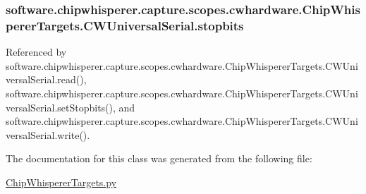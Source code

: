 \subsubsection[{stopbits}]{\setlength{\rightskip}{0pt plus 5cm}software.\+chipwhisperer.\+capture.\+scopes.\+cwhardware.\+Chip\+Whisperer\+Targets.\+C\+W\+Universal\+Serial.\+stopbits}\label{classsoftware_1_1chipwhisperer_1_1capture_1_1scopes_1_1cwhardware_1_1ChipWhispererTargets_1_1CWUniversalSerial_afe319dd6e0c353089c9d91278570ffa9}


Referenced by software.\+chipwhisperer.\+capture.\+scopes.\+cwhardware.\+Chip\+Whisperer\+Targets.\+C\+W\+Universal\+Serial.\+read(), software.\+chipwhisperer.\+capture.\+scopes.\+cwhardware.\+Chip\+Whisperer\+Targets.\+C\+W\+Universal\+Serial.\+set\+Stopbits(), and software.\+chipwhisperer.\+capture.\+scopes.\+cwhardware.\+Chip\+Whisperer\+Targets.\+C\+W\+Universal\+Serial.\+write().



The documentation for this class was generated from the following file\+:\begin{DoxyCompactItemize}
\item 
\hyperlink{ChipWhispererTargets_8py}{Chip\+Whisperer\+Targets.\+py}\end{DoxyCompactItemize}
